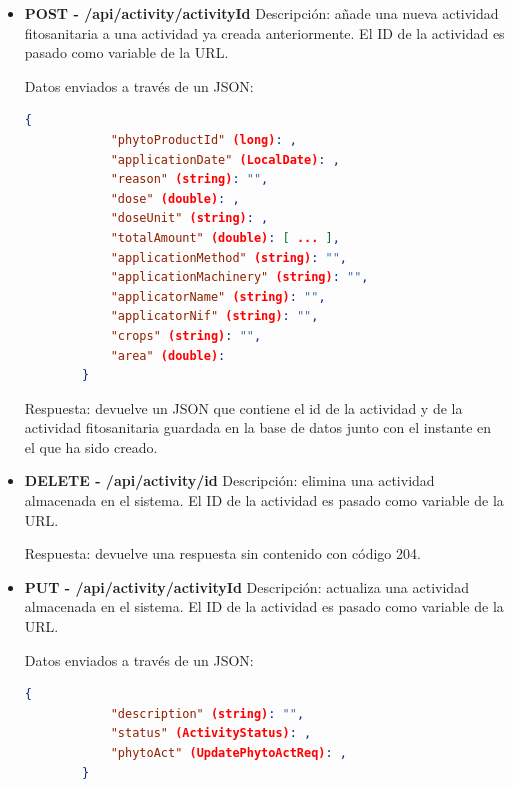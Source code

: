 \begin{itemize}
\begin{itemize}
        Respuesta: se devuelve un JSON que contiene el id de la actividad y de la actividad fitosanitaria guardada en la base de datos junto con el instante en el que ha sido creado.

        \item \textbf{POST - /api/activity/{activityId}} \newline
        Descripción: añade una nueva actividad fitosanitaria a una actividad ya creada anteriormente. El ID de la actividad es pasado como variable de la URL.

        Datos enviados a través de un JSON:
        \begin{lstlisting}[language=json,caption={Nueva actividad fitosanitaria añadida a una actividad}]
        {
            "phytoProductId" (long): ,
            "applicationDate" (LocalDate): ,
            "reason" (string): "",
            "dose" (double): ,
            "doseUnit" (string): ,
            "totalAmount" (double): [ ... ],
            "applicationMethod" (string): "",
            "applicationMachinery" (string): "",
            "applicatorName" (string): "",
            "applicatorNif" (string): "",
            "crops" (string): "",
            "area" (double):  
        }
        \end{lstlisting}

        Respuesta: devuelve un JSON que contiene el id de la actividad y de la actividad fitosanitaria guardada en la base de datos junto con el instante en el que ha sido creado. 

        \item \textbf{DELETE - /api/activity/{id}} \newline
        Descripción: elimina una actividad almacenada en el sistema. El ID de la actividad es pasado como variable de la URL.

        Respuesta: devuelve una respuesta sin contenido con código 204.

        \item \textbf{PUT - /api/activity/{activityId}} \newline
        Descripción: actualiza una actividad almacenada en el sistema. El ID de la actividad es pasado como variable de la URL.

        Datos enviados a través de un JSON:
        \begin{lstlisting}[language=json,caption={Actualización de actividad}]
        {
            "description" (string): "",
            "status" (ActivityStatus): ,
            "phytoAct" (UpdatePhytoActReq): ,
        }
        \end{lstlisting}


\end{itemize}
\end{itemize}
